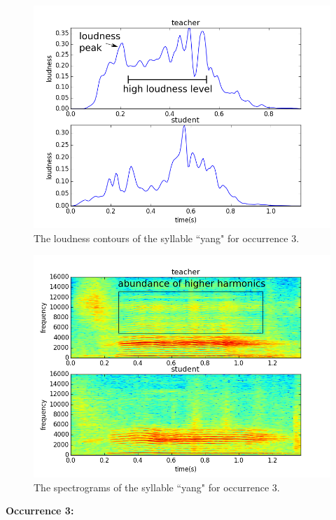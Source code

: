 \begin{figure}[ht!]
\includegraphics[width=\textwidth]{figs/spectro_vis/ch3_occ3_1.png}
\caption{The loudness contours of the syllable ``yang" for occurrence 3.}
\label{fig:occurrence_3_1}
\end{figure}

\begin{figure}[ht!]
\includegraphics[width=\textwidth]{figs/spectro_vis/ch3_occ3_2.png}
\caption{The spectrograms of the syllable ``yang" for occurrence 3.}
\label{fig:occurrence_3_2}
\end{figure}

\noindent\textbf{Occurrence 3:}

